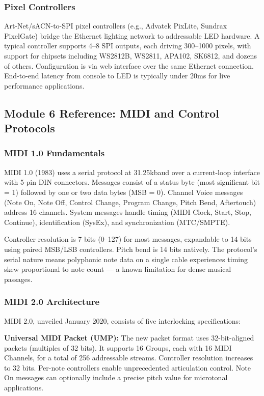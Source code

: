 \documentclass[11pt,letterpaper]{article}
\begin{document}
\subsubsection{Pixel Controllers}

Art-Net/sACN-to-SPI pixel controllers (e.g., Advatek PixLite, Sundrax PixelGate) bridge the Ethernet lighting network to addressable LED hardware. A typical controller supports 4--8 SPI outputs, each driving 300--1000 pixels, with support for chipsets including WS2812B, WS2811, APA102, SK6812, and dozens of others. Configuration is via web interface over the same Ethernet connection. End-to-end latency from console to LED is typically under 20ms for live performance applications.

\subsection{Module 6 Reference: MIDI and Control Protocols}

\subsubsection{MIDI 1.0 Fundamentals}

MIDI 1.0 (1983) uses a serial protocol at 31.25kbaud over a current-loop interface with 5-pin DIN connectors. Messages consist of a status byte (most significant bit = 1) followed by one or two data bytes (MSB = 0). Channel Voice messages (Note On, Note Off, Control Change, Program Change, Pitch Bend, Aftertouch) address 16 channels. System messages handle timing (MIDI Clock, Start, Stop, Continue), identification (SysEx), and synchronization (MTC/SMPTE).

Controller resolution is 7 bits (0--127) for most messages, expandable to 14 bits using paired MSB/LSB controllers. Pitch bend is 14 bits natively. The protocol's serial nature means polyphonic note data on a single cable experiences timing skew proportional to note count --- a known limitation for dense musical passages.

\subsubsection{MIDI 2.0 Architecture}

MIDI 2.0, unveiled January 2020, consists of five interlocking specifications:

\textbf{Universal MIDI Packet (UMP):} The new packet format uses 32-bit-aligned packets (multiples of 32 bits). It supports 16 Groups, each with 16 MIDI Channels, for a total of 256 addressable streams. Controller resolution increases to 32 bits. Per-note controllers enable unprecedented articulation control. Note On messages can optionally include a precise pitch value for microtonal applications.
\end{document}
